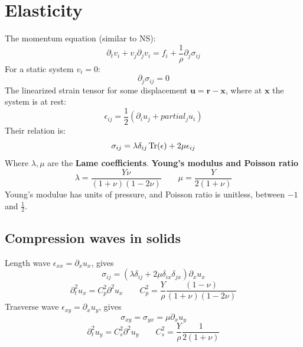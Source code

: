 \documentclass[twocolumn]{article}
\begin{document}
\section{Elasticity}
The momentum equation (similar to NS):
\begin{equation}
    \partial_t v_i + v_j \partial_j v_i = f_i + \frac{1}{\rho}\partial_j \sigma_{ij} 
\end{equation}
For a static system $v_i = 0$:
\begin{equation}
    \partial_j \sigma_{ij} = 0
\end{equation}
The linearized strain tensor for some displacement $\boldsymbol{u} = \boldsymbol{r} - \boldsymbol{x}$, where at $\boldsymbol{x}$ the system is at rest:
\begin{equation}
    \epsilon_{ij} = \frac{1}{2}\left(\partial_i u_j + partial_j u_i\right)
\end{equation}
Their relation is:
\begin{equation}
    \sigma_{ij} = \lambda\delta_{ij}\Tr(\epsilon) + 2\mu \epsilon_{ij}
\end{equation}
Where $\lambda, \mu$ are the \textbf{Lame coefficients}.
\newline
\textbf{Young's modulus and Poisson ratio}
\newline
\begin{equation}
    \lambda = \frac{Y\nu}{(1 + \nu)(1 - 2\nu)}
    \qquad
    \mu = \frac{Y}{2(1 + \nu)}
\end{equation}
Young's modulue has units of pressure, and Poisson ratio is unitless, between $-1$ and $\frac{1}{2}$.
\subsection{Compression waves in solids}
Length wave $\epsilon_{xx} = \partial_x u_x$, gives
\begin{equation}
    \sigma_{ij} = (\lambda\delta_{ij} + 2\mu \delta_{ix}\delta_{jx})\partial_x u_x
\end{equation}
\begin{equation}
    \partial_t^2 u_x = C_p^2\partial^2 u_x
    \qquad
    C_p^2 = \frac{Y}{\rho}\frac{(1 - \nu)}{(1 + \nu)(1 - 2\nu)}
\end{equation}
Trasverse wave $\epsilon_{xy} = \partial_x u_y$, gives
\begin{equation}
    \sigma_{xy} = \sigma_{yx} = \mu \partial_x u_y
\end{equation}
\begin{equation}
    \partial_t^2 u_y = C_s^2\partial^2 u_y
    \qquad
    C_s^2 = \frac{Y}{\rho}\frac{1}{2(1 + \nu)}
\end{equation}
\end{document}

